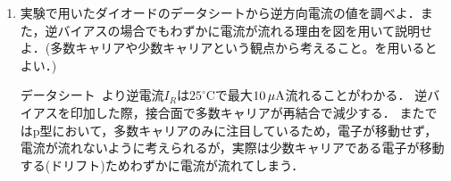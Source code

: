 \begin{enumerate}[(1)]
	\item 実験で用いたダイオードのデータシートから逆方向電流の値を調べよ．また，逆バイアスの場合でもわずかに電流が流れる理由を図を用いて説明せよ．(多数キャリアや少数キャリアという観点から考えること。を用いるとよい．)

データシート~\cite{sdfgvhsd}より逆電流$I_{R}$は$25^{\circ}$Cで最大$10\,\rm{\mu A}$流れることがわかる．
逆バイアスを印加した際，接合面で多数キャリアが再結合で減少する．
またではp型において，多数キャリアのみに注目しているため，電子が移動せず，電流が流れないように考えられるが，実際は少数キャリアである電子が移動する(ドリフト)ためわずかに電流が流れてしまう．
\end{enumerate}
